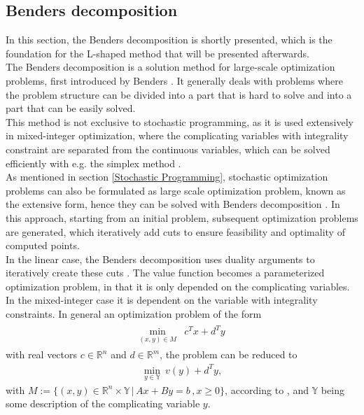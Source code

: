\subsection{Benders decomposition}\label{Benders Decompositions}
In this section, the Benders decomposition is shortly presented, which is the foundation for the L-shaped method that will be presented afterwards. \\
The Benders decomposition is a solution method for large-scale optimization problems, first introduced by Benders \cite{Benders1962}.
It generally deals with problems where the problem structure can be divided into a part that is hard to solve and into a part that can be easily solved. \\
This method is not exclusive to stochastic programming, as it is used extensively in mixed-integer optimization, where the complicating variables with integrality constraint are separated from the continuous variables, which can be solved efficiently with e.g. the simplex method \cite{floudas1995}. \\
As mentioned in section \ref{Stochastic Programming}, stochastic optimization problems can also be formulated as large scale optimization problem, known as the extensive form, hence they can be solved with Benders decomposition \cite{BirgeLouveaux}.
In this approach, starting from an initial problem, subsequent optimization problems are generated, which iteratively add cuts to ensure feasibility and optimality of computed points. \\
In the linear case, the Benders decomposition uses duality arguments to iteratively create these cuts \cite{ggo2}.
The value function becomes a parameterized optimization problem, in that it is only depended on the complicating variables.
In the mixed-integer case it is dependent on the variable with integrality constraints.
In general an optimization problem of the form
\begin{align}\label{MILP:Allgemeines Problem}
    \begin{array}{crcc}
        \underset{(x, y) \in M}{\min} &c^T  x  + d^T y              
    \end{array}
\end{align}
with real vectors $c \in \mathbb{R}^n$ and $d \in \mathbb{R}^m$, the problem can be reduced to
\begin{align}
\underset{y \in \mathbb{Y}}{\min}\: v(y) + d^Ty,
\end{align}
with $M := \{(x, y) \in \mathbb{R}^n \times \mathbb{Y} \, | \,  Ax + By =b \, , x \geq 0 \}$, according to \cite{ggo2}, and $\mathbb{Y}$ being some description of the complicating variable $y$.
